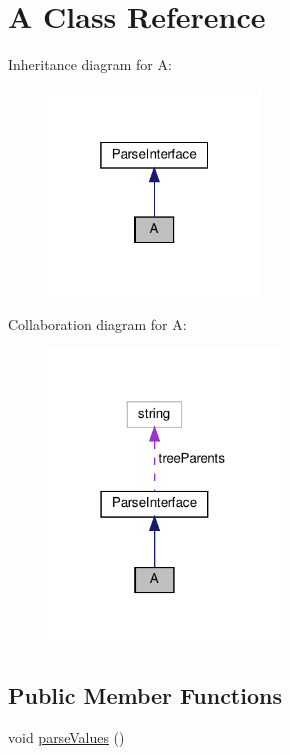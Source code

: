 \hypertarget{classA}{}\section{A Class Reference}
\label{classA}


Inheritance diagram for A\+:
\nopagebreak
\begin{figure}[H]
\begin{center}
\leavevmode
\includegraphics[width=160pt]{classA__inherit__graph}
\end{center}
\end{figure}


Collaboration diagram for A\+:
\nopagebreak
\begin{figure}[H]
\begin{center}
\leavevmode
\includegraphics[width=174pt]{classA__coll__graph}
\end{center}
\end{figure}
\subsection*{Public Member Functions}
\begin{DoxyCompactItemize}
\item 
void \hyperlink{classA_a71896ec8a87fd03a725668c503ec64e7}{parse\+Values} ()
\end{DoxyCompactItemize}
